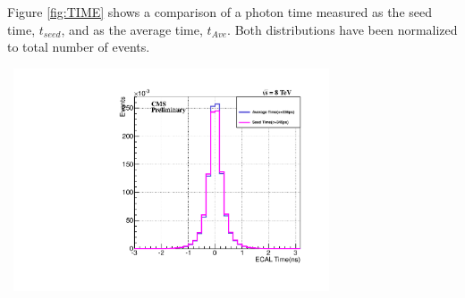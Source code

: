 Figure \ref{fig:TIME} shows a comparison of a photon time measured as the seed time, $t_{seed}$, and as the average time, $t_{Ave}$. Both distributions have been normalized to total number of events.

\vspace{5mm}
\begin{minipage}{0.90\linewidth} 
\begin{center}
\mbox{
\includegraphics[height=0.50\textwidth, width=0.7\textwidth]{THESISPLOTS/ECAL-SeedVsAveTime-Zee.pdf}
}
\label{fig:TIME}
\end{center}
\end{minipage}


